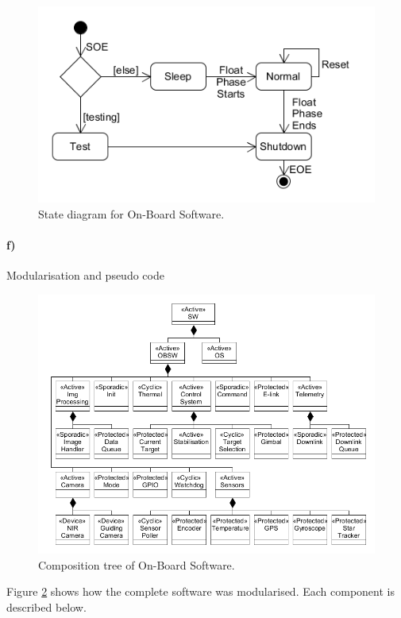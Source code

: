 \begin{figure}[H]
    \centering
    \includegraphics[width=.7\textwidth]{4-experiment-design/img/software/state-diagram.png}
    \caption{State diagram for On-Board Software.}
    \label{fig:software-state-diagram}
\end{figure}

\clearpage
\paragraph{f)} Modularisation and pseudo code

\begin{figure}[H]
    \centering
    \includegraphics[width=\textwidth]{4-experiment-design/img/software/composition-tree.png}
    \caption{Composition tree of On-Board Software.}
    \label{fig:software-composition-tree}
\end{figure}

Figure \ref{fig:software-composition-tree} shows how the complete software was modularised. Each component is described below.

